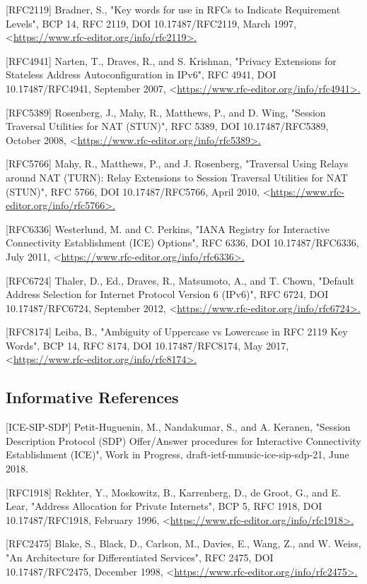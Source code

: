 \documentclass{article}
\begin{document}
[RFC2119]  Bradner, S., "Key words for use in RFCs to Indicate Requirement Levels", BCP 14, RFC 2119, DOI 10.17487/RFC2119, March 1997, <\url{https://www.rfc-editor.org/info/rfc2119>.}

[RFC4941]  Narten, T., Draves, R., and S. Krishnan, "Privacy Extensions for Stateless Address Autoconfiguration in IPv6", RFC 4941, DOI 10.17487/RFC4941, September 2007, <\url{https://www.rfc-editor.org/info/rfc4941>.}

[RFC5389]  Rosenberg, J., Mahy, R., Matthews, P., and D. Wing, "Session Traversal Utilities for NAT (STUN)", RFC 5389, DOI 10.17487/RFC5389, October 2008, <\url{https://www.rfc-editor.org/info/rfc5389>.}

[RFC5766]  Mahy, R., Matthews, P., and J. Rosenberg, "Traversal Using Relays around NAT (TURN): Relay Extensions to Session Traversal Utilities for NAT (STUN)", RFC 5766, DOI 10.17487/RFC5766, April 2010, <\url{https://www.rfc-editor.org/info/rfc5766>.}

[RFC6336]  Westerlund, M. and C. Perkins, "IANA Registry for Interactive Connectivity Establishment (ICE) Options", RFC 6336, DOI 10.17487/RFC6336, July 2011, <\url{https://www.rfc-editor.org/info/rfc6336>.}

[RFC6724]  Thaler, D., Ed., Draves, R., Matsumoto, A., and T. Chown, "Default Address Selection for Internet Protocol Version 6 (IPv6)", RFC 6724, DOI 10.17487/RFC6724, September 2012, <\url{https://www.rfc-editor.org/info/rfc6724>.}

[RFC8174]  Leiba, B., "Ambiguity of Uppercase vs Lowercase in RFC 2119 Key Words", BCP 14, RFC 8174, DOI 10.17487/RFC8174, May 2017, <\url{https://www.rfc-editor.org/info/rfc8174>.}

\subsection{Informative References}

[ICE-SIP-SDP] Petit-Huguenin, M., Nandakumar, S., and A. Keranen, "Session Description Protocol (SDP) Offer/Answer procedures for Interactive Connectivity Establishment (ICE)", Work in Progress, draft-ietf-mmusic-ice-sip-sdp-21, June 2018.

[RFC1918]  Rekhter, Y., Moskowitz, B., Karrenberg, D., de Groot, G., and E. Lear, "Address Allocation for Private Internets", BCP 5, RFC 1918, DOI 10.17487/RFC1918, February 1996, <\url{https://www.rfc-editor.org/info/rfc1918>.}

[RFC2475]  Blake, S., Black, D., Carlson, M., Davies, E., Wang, Z., and W. Weiss, "An Architecture for Differentiated Services", RFC 2475, DOI 10.17487/RFC2475, December 1998, <\url{https://www.rfc-editor.org/info/rfc2475>.}
\end{document}
